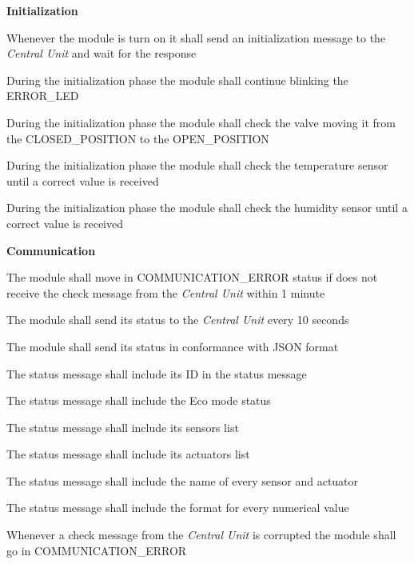 \begin{req_enum}
	\item \textbf{Initialization}
	\begin{req_enum}[label*=\arabic*.]
		\item Whenever the module is turn on it shall send an initialization message to the \textit{Central Unit} and wait for the response
		\item During the initialization phase the module shall continue blinking the ERROR\_LED
		\item During the initialization phase the module shall check the valve moving it from the CLOSED\_POSITION to the OPEN\_POSITION
		\item During the initialization phase the module shall check the temperature sensor until a correct value is received
		\item During the initialization phase the module shall check the humidity sensor until a correct value is received
	\end{req_enum}

	\item \textbf{Communication}
	\begin{req_enum}[label*=\arabic*.]
		\item The module shall move in COMMUNICATION\_ERROR status if does not receive the check message from the \textit{Central Unit} within 1 minute
		\item The module shall send its status to the \textit{Central Unit} every 10 seconds
		\item The module shall send its status in conformance with JSON format
		\begin{req_enum}[label*=\arabic*.]
			\item The status message shall include its ID in the status message
			\item The status message shall include the Eco mode status
			\item The status message shall include its sensors list
			\item The status message shall include its actuators list
			\item The status message shall include the name of every sensor and actuator
			\item The status message shall include the format for every numerical value
		\end{req_enum}
		\item Whenever a check message from the \textit{Central Unit} is corrupted the module shall go in COMMUNICATION\_ERROR
	\end{req_enum}


\end{req_enum}
